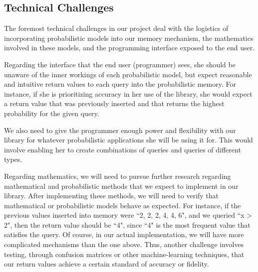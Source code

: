 \documentclass{sig-alternate}
\begin{document}
\subsection{Technical Challenges}
\label{subsec:tech_challenges}
The foremost technical challenges in our project deal with the logistics of incorporating
probabilistic models into our memory mechanism, the mathematics involved in these models,
and the programming interface exposed to the end user.

Regarding the interface that the end user (programmer) sees, she should be unaware of 
the inner workings of each probabilistic model, but expect reasonable and intuitive return values
to each query into the probabilistic memory. For instance, if she is prioritizing accuracy 
in her use of the library, she would expect a return value that was previously inserted and that 
returns the highest probability for the given query.

We also need to give the programmer enough power and flexibility with our library for 
whatever probabilistic applications she will be using it for. This would involve enabling 
her to create combinations of queries and queries of different types.

Regarding mathematics, we will need to pursue further research regarding mathematical 
and probabilistic methods that we expect to implement in our library. After implementing these methods,
we will need to verify that mathematical or probabilistic models behave as expected. 
For instance, if the previous values inserted into memory were ``2, 2, 2, 4, 4, 6", and we queried ``x > 2", 
then the return value should be ``4", since ``4" is the most frequent value that satisfies the query.
Of course, in our actual implementation, we will have more complicated mechanisms than the one above.
Thus, another challenge involves testing, through confusion matrices or other machine-learning techniques,
that our return values achieve a certain standard of accuracy or fidelity.

\end{document}
